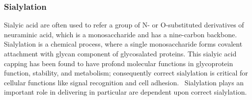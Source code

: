 \subsubsection {Sialylation}
Sialyic acid are often used to refer a group of N- or O-substituted derivatives of neuraminic acid, which is a monosaccharide and has a nine-carbon backbone.~\cite{Vocadlo_2009} Sialylation is a chemical process, where a single monosaccharide forms covalent attachment with glycan component of glycosalated proteins. This sialyic acid capping has been found to have profond molecular functions in glycoprotein function, stability, and metabolism; consequently correct sialylation is critical for cellular functions like signal recognition and cell adhesion.~\cite{Bhide_2016} Sialylation plays an important role in delivering in particular are dependent upon correct sialylation.
